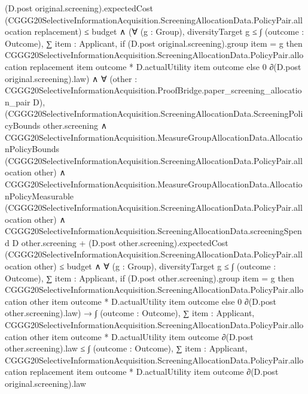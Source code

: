 \documentclass[10pt]{article}
\begin{document}
\begin{ReviewVerbatim}
                  (D.post original.screening).expectedCost
                    (CGGG20SelectiveInformationAcquisition.ScreeningAllocationData.PolicyPair.allocation replacement) ≤
                budget ∧
              (∀ (g : Group),
                  diversityTarget g ≤
                    ∫ (outcome : Outcome),
                      ∑ item : Applicant,
                        if (D.post original.screening).group item = g then
                          CGGG20SelectiveInformationAcquisition.ScreeningAllocationData.PolicyPair.allocation
                              replacement item outcome *
                            D.actualUtility item outcome
                        else 0 ∂(D.post original.screening).law) ∧
                ∀ (other : CGGG20SelectiveInformationAcquisition.ProofBridge.paper_screening_allocation_pair D),
                  (CGGG20SelectiveInformationAcquisition.ScreeningAllocationData.ScreeningPolicyBounds other.screening ∧
                      CGGG20SelectiveInformationAcquisition.MeasureGroupAllocationData.AllocationPolicyBounds
                          (CGGG20SelectiveInformationAcquisition.ScreeningAllocationData.PolicyPair.allocation other) ∧
                        CGGG20SelectiveInformationAcquisition.MeasureGroupAllocationData.AllocationPolicyMeasurable
                            (CGGG20SelectiveInformationAcquisition.ScreeningAllocationData.PolicyPair.allocation
                              other) ∧
                          CGGG20SelectiveInformationAcquisition.ScreeningAllocationData.screeningSpend D
                                  other.screening +
                                (D.post other.screening).expectedCost
                                  (CGGG20SelectiveInformationAcquisition.ScreeningAllocationData.PolicyPair.allocation
                                    other) ≤
                              budget ∧
                            ∀ (g : Group),
                              diversityTarget g ≤
                                ∫ (outcome : Outcome),
                                  ∑ item : Applicant,
                                    if (D.post other.screening).group item = g then
                                      CGGG20SelectiveInformationAcquisition.ScreeningAllocationData.PolicyPair.allocation
                                          other item outcome *
                                        D.actualUtility item outcome
                                    else 0 ∂(D.post other.screening).law) →
                    ∫ (outcome : Outcome),
                        ∑ item : Applicant,
                          CGGG20SelectiveInformationAcquisition.ScreeningAllocationData.PolicyPair.allocation other item
                              outcome *
                            D.actualUtility item outcome ∂(D.post other.screening).law ≤
                      ∫ (outcome : Outcome),
                        ∑ item : Applicant,
                          CGGG20SelectiveInformationAcquisition.ScreeningAllocationData.PolicyPair.allocation
                              replacement item outcome *
                            D.actualUtility item outcome ∂(D.post original.screening).law
\end{ReviewVerbatim}
\end{document}
